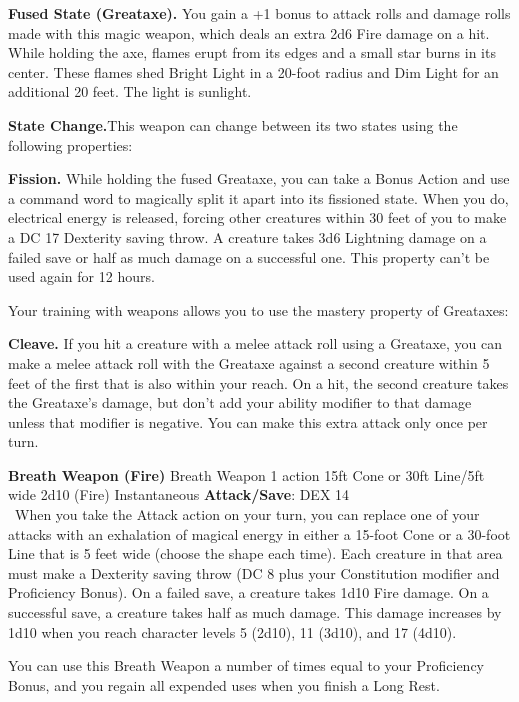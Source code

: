 \textbf{Fused State (Greataxe).} You gain a +1 bonus to attack rolls and damage rolls made with this magic weapon, which deals an extra 2d6 Fire damage on a hit.
While holding the axe, flames erupt from its edges and a small star burns in its center. 
These flames shed Bright Light in a 20-foot radius and Dim Light for an additional 20 feet. The light is sunlight.

\textbf{State Change.}This weapon can change between its two states using the following properties:

\textbf{Fission.} While holding the fused Greataxe, you can take a Bonus Action and use a command word to magically split it apart into its fissioned state. 
When you do, electrical energy is released, forcing other creatures within 30 feet of you to make a DC 17 Dexterity saving throw. 
A creature takes 3d6 Lightning damage on a failed save or half as much damage on a successful one. 
This property can’t be used again for 12 hours.

Your training with weapons allows you to use the mastery property of Greataxes:

\textbf{Cleave.} If you hit a creature with a melee attack roll using a Greataxe, you can make a melee attack roll with the Greataxe against a second creature within 5 feet of the first that is also within your reach. 
On a hit, the second creature takes the Greataxe’s damage, but don’t add your ability modifier to that damage unless that modifier is negative. 
You can make this extra attack only once per turn.

\DndSpellHeader%
  {\textbf{Breath Weapon (Fire)}}
  {Breath Weapon}
  {1 action}
  {15ft Cone or 30ft Line/5ft wide}
  {2d10 (Fire)}
  {Instantaneous}
  {\textbf{Attack/Save}: DEX 14}\\\
When you take the Attack action on your turn, you can replace one of your attacks with an exhalation of magical energy in either a 15-foot Cone or a 30-foot Line that is 5 feet wide (choose the shape each time).
Each creature in that area must make a Dexterity saving throw (DC 8 plus your Constitution modifier and Proficiency Bonus).
On a failed save, a creature takes 1d10 Fire damage. On a successful save, a creature takes half as much damage. 
This damage increases by 1d10 when you reach character levels 5 (2d10), 11 (3d10), and 17 (4d10).

You can use this Breath Weapon a number of times equal to your Proficiency Bonus, and you regain all expended uses when you finish a Long Rest.



